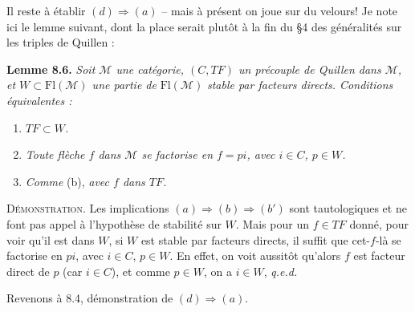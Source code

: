 \documentclass[11pt]{article}
\newcommand{\msp}[1]{\marginpar{\footnotesize [#1]}}
\begin{document}
Il reste à établir $(d) \Longrightarrow (a)$ – mais à présent on joue sur du velours! Je note ici le lemme suivant, dont la place serait plutôt à la fin du \S4 des généralités sur les triples de Quillen :

\msp{page 109}

\textbf{Lemme 8.6.} \textit{Soit $\mathcal{M}$ une catégorie, $(C,TF)$ un précouple de Quillen dans $\mathcal{M}$, et $W \subset \mathrm{Fl}(\mathcal{M})$ une partie de} $\mathrm{Fl}(\mathcal{M})$ \textit{stable par facteurs directs. Conditions équivalentes :}
\begin{enumerate}[leftmargin=2.5em]
\item[a)] \textit{$TF \subset W$.}
\item[b)] \textit{Toute flèche $f$ dans $\mathcal{M}$ se factorise en $f = pi$, avec $i \in C$, $p \in W$.}
\item[b$'$)] \textit{Comme} (b), \textit{avec $f$ dans $TF$.}
\end{enumerate}

\textsc{Démonstration}. Les implications $(a) \Longrightarrow (b) \Longrightarrow (b')$ sont tautologiques et ne font pas appel à l'hypothèse de stabilité sur $W$. Mais pour un $f \in TF$ donné, pour voir qu'il est dans $W$, si $W$ est stable par facteurs directs, il suffit que cet-$f$-là se factorise en $pi$, avec $i \in C$, $p \in W$. En effet, on voit aussitôt qu'alors $f$ est facteur direct de $p$ (car $i \in C$), et comme $p \in W$, on a $i \in W$, \quad \textit{q.e.d.} %

Revenons à 8.4, démonstration de $(d) \Longrightarrow (a)$.



\msp{page 110}
\end{document}
